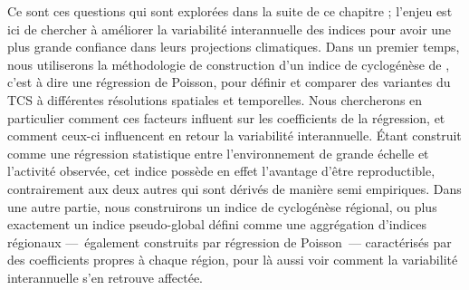 \documentclass[../main.tex]{subfiles}
\begin{document}
Ce sont ces questions qui sont explorées dans la suite de ce chapitre ; l'enjeu est ici de chercher à améliorer la variabilité interannuelle des indices pour
avoir une plus grande confiance dans leurs projections climatiques. Dans un premier temps, nous utiliserons la méthodologie de construction d'un indice de
cyclogénèse de \textcite{tippett_poisson_2011}, c'est à dire une régression de Poisson, pour définir et comparer des variantes du TCS à différentes résolutions
spatiales et temporelles. Nous chercherons en particulier comment ces facteurs influent sur les coefficients de la régression, et comment ceux-ci influencent en
retour la variabilité interannuelle. Étant construit comme une régression statistique entre l'environnement de grande échelle et l'activité observée, cet indice
possède en effet l'avantage d'être reproductible, contrairement aux deux autres qui sont dérivés de manière semi empiriques. Dans une autre partie, nous
construirons un indice de cyclogénèse régional, ou plus exactement un indice pseudo-global défini comme une aggrégation d'indices régionaux ---~également
construits par régression de Poisson~--- caractérisés par des coefficients propres à chaque région, pour là aussi voir comment la variabilité interannuelle s'en
retrouve affectée.


\end{document}
